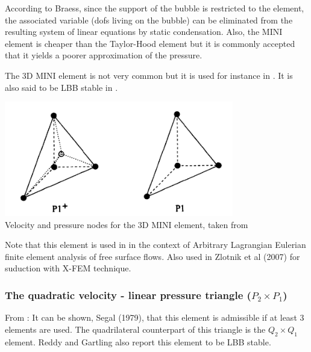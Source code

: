 \begin{remark}
According to Braess\cite{braess}, since the support of the bubble is restricted to the element, 
the associated variable (dofs living on the bubble) can be eliminated from the resulting 
system of linear equations by static condensation. 
Also, the MINI element is cheaper than the Taylor-Hood element but it is commonly accepted
that it yields a poorer approximation of the pressure.
\end{remark}

The 3D MINI element is not very common but it is used for instance in \cite{pico98}.
It is also said to be LBB stable in \cite[p180]{reddybook2}.

\begin{center}
\includegraphics[width=10cm]{images/mini/mini3D}\\
{\captionfont Velocity and pressure nodes for the 3D MINI element, taken from \cite{pico98}}
\end{center}

Note that this element is used in \cite{brwr00} in the context of Arbitrary Lagrangian Eulerian 
finite element analysis of free surface flows.
Also used in Zlotnik et al (2007) \cite{zldf07} for suduction with X-FEM technique.







\subsubsection{The quadratic velocity - linear pressure triangle ($P_2\times P_1$)}

From \cite{segal}: 
It can be shown, Segal (1979), that this element is admissible if at least 3 elements 
are used. The quadrilateral counterpart of this triangle is the $Q_2\times Q_1$ element.
Reddy and Gartling \cite[p179]{reddybook2} also report this element to be LBB stable.

